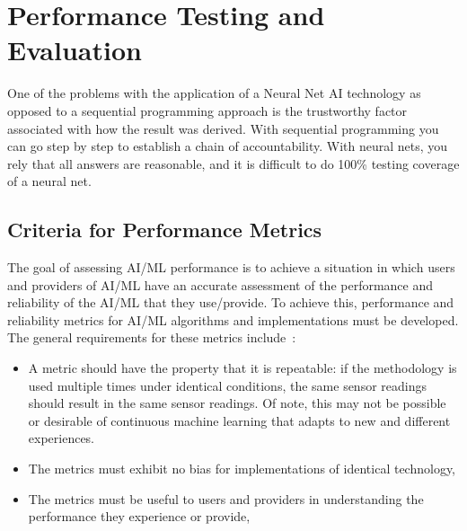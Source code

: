 \newpage
\section{Performance Testing and Evaluation}
\label{chapter 4}

One of the problems  with the application of a Neural Net AI technology as opposed to a sequential programming approach is the trustworthy factor associated with how the result was derived. With sequential programming you can go step by step to establish a chain of accountability. With neural nets, you rely that all answers are reasonable, and it is difficult to  do 100\% testing coverage of a neural net.



\subsection{Criteria for Performance Metrics}
The  goal of assessing AI/ML performance is to  achieve a situation in which users and providers of AI/ML have an accurate assessment of the performance and reliability of the AI/ML that they use/provide. To achieve this, performance and reliability metrics for AI/ML algorithms and implementations must be developed. The general requirements for these metrics include~\cite{paxson1998framework}:
 
\begin{itemize}
\item   A metric should have the property that it is repeatable: if the methodology is used multiple times under identical conditions, the same sensor readings should result in the same sensor readings. Of note, this may not be possible or desirable of continuous machine learning that adapts to new and different experiences.
   
\item The metrics must exhibit no bias for  implementations of identical technology, 
\item The metrics must be useful to users and providers in understanding the performance they experience or provide,

\end{itemize}

